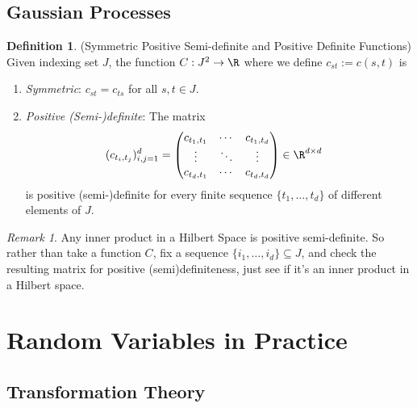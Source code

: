 \documentclass[12pt]{article}
\theoremstyle{plain}
\theoremstyle{definition}
\newtheorem{defn}[thm]{Definition}
\theoremstyle{remark}
\newtheorem*{rmk}{Remark}
\newcommand{\ra}{\rightarrow}
\begin{document}
\clearpage
\subsection{Gaussian Processes}

\begin{defn}
(Symmetric Positive Semi-definite and Positive Definite Functions)
Given indexing set $J$, the function $C:J^2 \ra \R$ where we define
$c_{st}:=c(s,t)$ is
\begin{enumerate}
  \item \emph{Symmetric}: $c_{st}=c_{ts}$ for all $s,t \in J$.
  \item \emph{Positive (Semi-)definite}: The matrix
    \begin{align*}
      (c_{t_i,t_j})^d_{i,j=1}
      &=
      \begin{pmatrix}
        c_{t_1,t_1} &\cdots & c_{t_1,t_d} \\
        \vdots &\ddots & \vdots \\
        c_{t_d,t_1} &\cdots & c_{t_d,t_d} \\
      \end{pmatrix}
      \in \R^{d\times d}
    \end{align*}
    is positive (semi-)definite for every finite sequence
    $\{t_1,\ldots,t_d\}$ of different elements of $J$.
\end{enumerate}
\end{defn}

\begin{rmk}
Any inner product in a Hilbert Space is positive semi-definite. So
rather than take a function $C$, fix a sequence
$\{i_1,\ldots,i_d\}\subseteq J$, and check the resulting matrix for
positive (semi)definiteness, just see if it's an inner product in a
Hilbert space.
\end{rmk}


\clearpage
\section{Random Variables in Practice}
\subsection{Transformation Theory}
\end{document}
